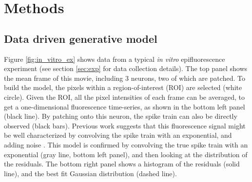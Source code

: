 \documentclass{article}
\begin{document}
\section{Methods} \label{sec:methods}



\subsection{Data driven generative model} \label{sec:model}

Figure \ref{fig:in_vitro_ex} shows data from a typical \emph{in vitro} epifluorescence experiment (see section \ref{sec:exp} for data collection details).  The top panel shows the mean frame of this movie, including 3 neurons, two of which are patched.  To build the model, the pixels within a region-of-interest (ROI) are selected (white circle).  Given the ROI, all the pixel intensities of each frame can be averaged, to get a one-dimensional fluorescence time-series, as shown in the bottom left panel (black line).  By patching onto this neuron, the spike train can also be directly observed (black bars). Previous work suggests that this fluorescence signal might be well characterized by convolving the spike train with an exponential, and adding noise \cite{ImagingManual}.  This model is confirmed by convolving the true spike train with an exponential (gray line, bottom left panel), and then looking at the distribution of the residuals.  The bottom right panel shows a histogram of the residuals (solid line), and the best fit Gaussian distribution (dashed line).
\end{document}
